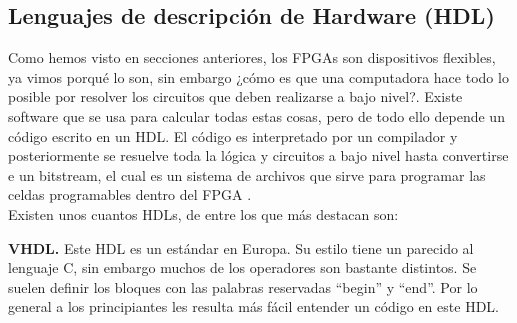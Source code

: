 \documentclass[twoside,spanish,ESP,MSc]{plantillaLabUPV}
\theoremstyle{definition}
\newcommand{\f}{FPGA }
\newcommand{\fs}{FPGAs }
\begin{document}



\subsection{Lenguajes de descripción de Hardware (HDL)}

Como hemos visto en secciones anteriores, los \fs son dispositivos flexibles, ya vimos porqué lo son, sin embargo ¿cómo es que una computadora hace todo lo posible por resolver los circuitos que deben realizarse a bajo nivel?. Existe software que se usa para calcular todas estas cosas, pero de todo ello depende un código escrito en un HDL. El código es interpretado por un compilador y posteriormente se resuelve toda la lógica y circuitos a bajo nivel hasta convertirse e un bitstream, el cual es un sistema de archivos que sirve para programar las celdas programables dentro del \f.\\

Existen unos cuantos HDLs, de entre los que más destacan son:


\checkmark\textbf{VHDL.} Este HDL es un estándar en Europa. Su estilo tiene un parecido al lenguaje C, sin embargo muchos de los operadores son bastante distintos. Se suelen definir los bloques con las palabras reservadas ``begin'' y ``end''. Por lo general a los principiantes les resulta más fácil entender un código en este HDL.\\

\end{document}
